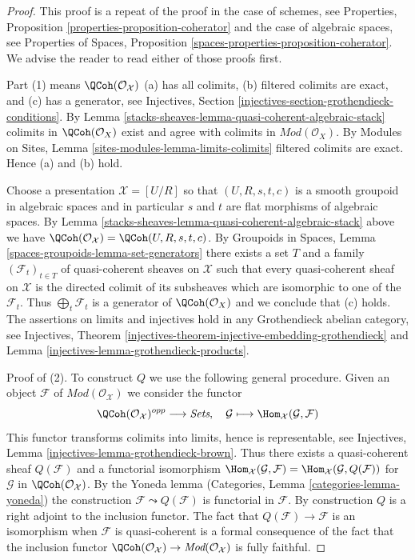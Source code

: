 \begin{proof}
This proof is a repeat of the proof in the case of schemes, see
Properties, Proposition \ref{properties-proposition-coherator}
and the case of algebraic spaces, see
Properties of Spaces, Proposition
\ref{spaces-properties-proposition-coherator}.
We advise the reader to read either of those proofs first.

\medskip\noindent
Part (1) means $\QCoh(\mathcal{O}_\mathcal{X})$ (a) has all colimits,
(b) filtered colimits are exact, and (c) has a generator, see
Injectives, Section \ref{injectives-section-grothendieck-conditions}.
By Lemma \ref{stacks-sheaves-lemma-quasi-coherent-algebraic-stack}
colimits in $\QCoh(\mathcal{O}_X)$ exist and agree
with colimits in $\textit{Mod}(\mathcal{O}_X)$. By
Modules on Sites, Lemma \ref{sites-modules-lemma-limits-colimits}
filtered colimits are exact. Hence (a) and (b) hold.

\medskip\noindent
Choose a presentation $\mathcal{X} = [U/R]$ so that $(U, R, s, t, c)$
is a smooth groupoid in algebraic spaces and in particular $s$ and $t$
are flat morphisms of algebraic spaces. By
Lemma \ref{stacks-sheaves-lemma-quasi-coherent-algebraic-stack}
above we have
$\QCoh(\mathcal{O}_\mathcal{X}) = \QCoh(U, R, s, t, c)$.
By Groupoids in Spaces, Lemma \ref{spaces-groupoids-lemma-set-generators}
there exists a set $T$ and a family $(\mathcal{F}_t)_{t \in T}$ of
quasi-coherent sheaves on $\mathcal{X}$ such that every quasi-coherent
sheaf on $\mathcal{X}$ is the directed colimit of its subsheaves
which are isomorphic to one of the $\mathcal{F}_t$.
Thus $\bigoplus_t \mathcal{F}_t$ is
a generator of $\QCoh(\mathcal{O}_X)$ and we conclude that (c) holds.
The assertions on limits and injectives hold in any
Grothendieck abelian category, see
Injectives, Theorem
\ref{injectives-theorem-injective-embedding-grothendieck} and
Lemma \ref{injectives-lemma-grothendieck-products}.

\medskip\noindent
Proof of (2). To construct $Q$ we use the following general procedure.
Given an object $\mathcal{F}$ of $\textit{Mod}(\mathcal{O}_\mathcal{X})$
we consider the functor
$$
\QCoh(\mathcal{O}_\mathcal{X})^{opp}
\longrightarrow
\textit{Sets},
\quad
\mathcal{G}
\longmapsto
\Hom_\mathcal{X}(\mathcal{G}, \mathcal{F})
$$
This functor transforms colimits into limits,
hence is representable, see
Injectives, Lemma \ref{injectives-lemma-grothendieck-brown}.
Thus there exists a quasi-coherent sheaf $Q(\mathcal{F})$
and a functorial isomorphism
$\Hom_\mathcal{X}(\mathcal{G}, \mathcal{F}) =
\Hom_\mathcal{X}(\mathcal{G}, Q(\mathcal{F}))$
for $\mathcal{G}$ in $\QCoh(\mathcal{O}_\mathcal{X})$.
By the Yoneda lemma
(Categories, Lemma \ref{categories-lemma-yoneda})
the construction $\mathcal{F} \leadsto Q(\mathcal{F})$ is
functorial in $\mathcal{F}$. By construction $Q$ is a right
adjoint to the inclusion functor.
The fact that $Q(\mathcal{F}) \to \mathcal{F}$ is an isomorphism
when $\mathcal{F}$ is quasi-coherent is a formal consequence of the fact
that the inclusion functor
$\QCoh(\mathcal{O}_\mathcal{X}) \to
\textit{Mod}(\mathcal{O}_\mathcal{X})$
is fully faithful.
\end{proof}

